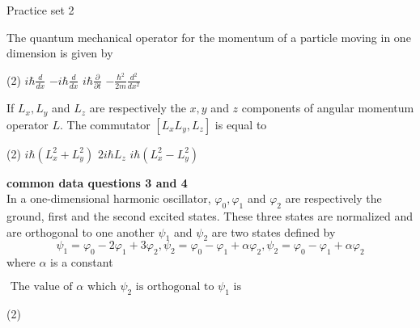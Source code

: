 \newpage
\begin{abox}
	Practice set 2
	\end{abox}
\begin{enumerate}
	\begin{minipage}{\textwidth}
		\item The quantum mechanical operator for the momentum of a particle moving in one dimension is given by
	\end{minipage}
	\begin{tasks}(2)
		\task[\textbf{A.}] $i \hbar \frac{d}{d x}$
		\task[\textbf{B.}]$-i \hbar \frac{d}{d x}$
		\task[\textbf{C.}]$i \hbar \frac{\partial}{\partial t}$
		\task[\textbf{D.}]$-\frac{\hbar^{2}}{2 m} \frac{d^{2}}{d x^{2}}$
	\end{tasks}
\begin{minipage}{\textwidth}
	\item If $L_{x}, L_{y}$ and $L_{z}$ are respectively the $x, y$ and $z$ components of angular momentum operator $L$. The commutator $\left[L_{x} L_{y}, L_{z}\right]$ is equal to
\end{minipage}
\begin{tasks}(2)
	\task[\textbf{A.}] $i \hbar\left(L_{x}^{2}+L_{y}^{2}\right)$
	\task[\textbf{B.}]$2 i \hbar L_{z}$
	\task[\textbf{C.}]$i \hbar\left(L_{x}^{2}-L_{y}^{2}\right)$
\end{tasks}
\textbf{common data questions 3 and 4 }\\
In a one-dimensional harmonic oscillator, $\varphi_{0}, \varphi_{1}$ and $\varphi_{2}$ are respectively the ground, first and the second excited states. These three states are normalized and are orthogonal to one another $\psi_{1}$ and $\psi_{2}$ are two states defined by
$$
\psi_{1}=\varphi_{0}-2 \varphi_{1}+3 \varphi_{2}, \psi_{2}=\varphi_{0}-\varphi_{1}+\alpha \varphi_{2}, \psi_{2}=\varphi_{0}-\varphi_{1}+\alpha \varphi_{2}
$$
where $\alpha$ is a constant\\
\begin{minipage}{\textwidth}
	\item $\text { The value of } \alpha \text { which } \psi_{2} \text { is orthogonal to } \psi_{1} \text { is }$
\end{minipage}
\begin{tasks}(2)
\end{tasks}
\begin{minipage}{\textwidth}

\end{minipage}
\end{enumerate}
